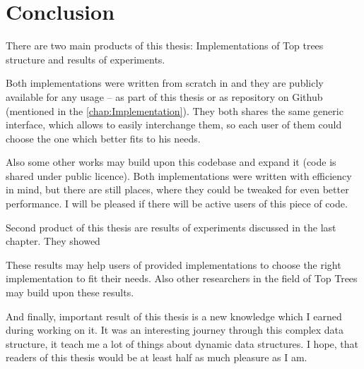 \chapter*{Conclusion}

There are two main products of this thesis: Implementations of Top trees
structure and results of experiments.

Both implementations were written from scratch in \Cpp{} and they are publicly
available for any usage -- as part of this thesis or as repository on Github
(mentioned in the \cref{chap:Implementation}). They both shares the same generic
interface, which allows to easily interchange them, so each user of them could
choose the one which better fits to his needs.

Also some other works may build upon this codebase and expand it (code is shared
under public licence). Both implementations were written with efficiency in
mind, but there are still places, where they could be tweaked for even better
performance. I will be pleased if there will be active users of this piece of
code.

\bigskip

Second product of this thesis are results of experiments discussed in the last
chapter. They showed 

These results may help users of provided implementations to choose the right
implementation to fit their needs. Also other researchers in the field of Top
Trees may build upon these results.

\bigskip

And finally, important result of this thesis is a new knowledge which I earned
during working on it. It was an interesting journey through this complex data
structure, it teach me a lot of things about dynamic data structures. I hope,
that readers of this thesis would be at least half as much pleasure as I am.
